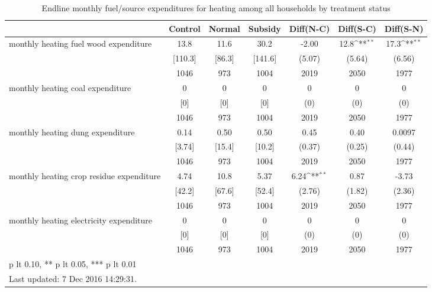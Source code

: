 \begin{table}[htbp]\centering
\def\sym#1{\ifmmode^{#1}\else\(^{#1}\)\fi}
\caption{Endline monthly fuel/source expenditures for heating among all households by treatment status \label{tab:"balance"}}
\begin{tabular*}{1\hsize}{@{\hskip\tabcolsep\extracolsep\fill}l*{1}{cccccc}}
\toprule
                                &  Control&   Normal&  Subsidy&Diff(N-C)         &Diff(S-C)         &Diff(S-N)         \\
\midrule
monthly heating fuel wood expenditure&     13.8&     11.6&     30.2&    -2.00         &     12.8\sym{**} &     17.3\sym{**} \\
                                &  [110.3]&   [86.3]&  [141.6]&   (5.07)         &   (5.64)         &   (6.56)         \\
                                &     1046&      973&     1004&     2019         &     2050         &     1977         \\
monthly heating coal expenditure&        0&        0&        0&        0         &        0         &        0         \\
                                &      [0]&      [0]&      [0]&      (0)         &      (0)         &      (0)         \\
                                &     1046&      973&     1004&     2019         &     2050         &     1977         \\
monthly heating dung expenditure&     0.14&     0.50&     0.50&     0.45         &     0.40         &   0.0097         \\
                                &   [3.74]&   [15.4]&   [10.2]&   (0.37)         &   (0.25)         &   (0.44)         \\
                                &     1046&      973&     1004&     2019         &     2050         &     1977         \\
monthly heating crop residue expenditure&     4.74&     10.8&     5.37&     6.24\sym{**} &     0.87         &    -3.73         \\
                                &   [42.2]&   [67.6]&   [52.4]&   (2.76)         &   (1.82)         &   (2.36)         \\
                                &     1046&      973&     1004&     2019         &     2050         &     1977         \\
monthly heating electricity expenditure&        0&        0&        0&        0         &        0         &        0         \\
                                &      [0]&      [0]&      [0]&      (0)         &      (0)         &      (0)         \\
                                &     1046&      973&     1004&     2019         &     2050         &     1977         \\
\bottomrule
\multicolumn{7}{l}{\footnotesize * p lt 0.10, ** p lt 0.05, *** p lt 0.01}\\
\multicolumn{7}{l}{\footnotesize Last updated:  7 Dec 2016 14:29:31.}\\
\end{tabular*}
\end{table}
